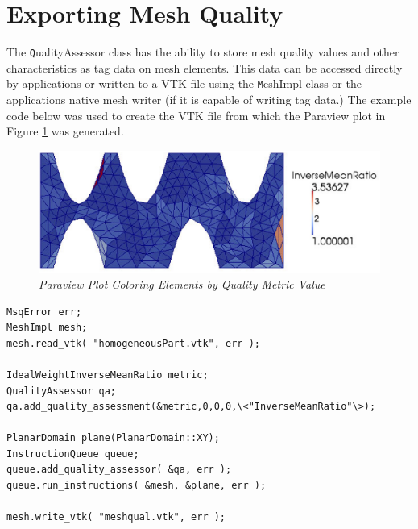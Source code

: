 \section{Exporting Mesh Quality}

The {\texttt QualityAssessor} class has the ability to store mesh quality values and other characteristics as tag data on mesh elements.  This data can be accessed directly by applications or written to a VTK file using the {\texttt MeshImpl} class or the applications native mesh writer (if it is capable of writing tag data.)	 The example code below was used to create the VTK file from which the Paraview plot in Figure \ref{fig:meshqual} was generated.

\begin{figure}[htb!]
\begin{center}
\includegraphics[width=5in]{meshqual}
\caption{\em Paraview Plot Coloring Elements by Quality Metric Value \label{fig:meshqual}}
\end{center}
\end{figure}

\newpage
\begin{samepage}
\begin{lstlisting}[frame=single]
MsqError err;
MeshImpl mesh;
mesh.read_vtk( "homogeneousPart.vtk", err );

IdealWeightInverseMeanRatio metric;
QualityAssessor qa;
qa.add_quality_assessment(&metric,0,0,0,\<"InverseMeanRatio"\>);

PlanarDomain plane(PlanarDomain::XY);
InstructionQueue queue;
queue.add_quality_assessor( &qa, err );
queue.run_instructions( &mesh, &plane, err );

mesh.write_vtk( "meshqual.vtk", err );
\end{lstlisting}
\end{samepage}

